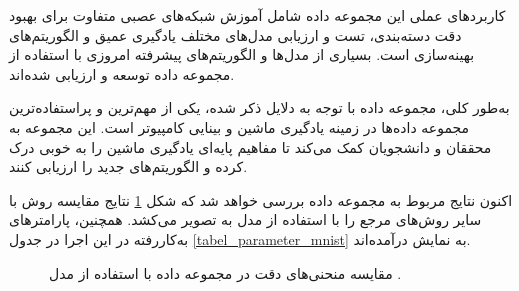 کاربردهای عملی این مجموعه داده شامل آموزش شبکه‌های عصبی متفاوت برای بهبود دقت دسته‌بندی، تست و ارزیابی مدل‌های مختلف یادگیری عمیق و الگوریتم‌های بهینه‌سازی است. بسیاری از مدل‌ها و الگوریتم‌های پیشرفته امروزی با استفاده از مجموعه داده
توسعه و ارزیابی شده‌اند.

به‌طور کلی، مجموعه داده
با توجه به دلایل ذکر شده، یکی از مهم‌ترین و پراستفاده‌ترین مجموعه داده‌ها در زمینه یادگیری ماشین و بینایی کامپیوتر است. این مجموعه به محققان و دانشجویان کمک می‌کند تا مفاهیم پایه‌ای یادگیری ماشین را به خوبی درک کرده و الگوریتم‌های جدید را ارزیابی کنند.



اکنون نتایج مربوط به مجموعه داده
بررسی خواهد شد که شکل
\ref{result_mnist_mlp}
نتایج مقایسه روش
با سایر روش‌های مرجع را با استفاده از مدل
به تصویر می‌کشد.
همچنین، پارامترهای به‌کاررفته در این اجرا در جدول
\ref{tabel_parameter_mnist} 
به نمایش درآمده‌اند.
\begin{figure}[b!]
	\centering
	\hspace{0.8mm}
	\caption{
		مقایسه منحنی‌های دقت در مجموعه داده
		با استفاده از مدل
		.
	}
	\label{result_mnist_mlp}
\end{figure}
